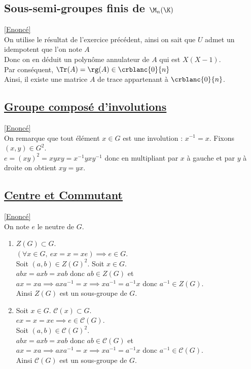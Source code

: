 \documentclass[8pt]{book}
\begin{document}
	\subsection{Sous-semi-groupes finis de $\M_n(\K)$ }
	\label{Sous-semi-groupes finis de Mn(K) corrigé}
	\textcolor{blue}{\hyperref[Sous-semi-groupes finis de Mn(K)]{[Enoncé]}}\\
	On utilise le résultat de l'exercice précédent, ainsi on sait que $U$ admet un idempotent que l'on note $A$
	\\ Donc on en déduit un polynôme annulateur de $A$ qui est $X(X-1)$. 
	\\Par conséquent, $\Tr(A)=\rg(A)\in\crblanc{0}{n}$
	\\Ainsi, il existe une matrice $A$ de trace appartenant à $\crblanc{0}{n}$. 
	
	\subsection{\underline{Groupe composé d'involutions} }
	\label{Groupe composé d'involutions corrigé}
	\textcolor{blue}{\hyperref[Groupe composé d'involutions]{[Enoncé]}}\\
	On remarque que tout élément $x\in G$ est une involution : $x^{-1}=x$. Fixons $(x,y)\in G^2$.\\
	$e=(xy)^2=xyxy=x^{-1}yxy^{-1}$ donc en multipliant par $x$ à gauche et par $y$ à droite on obtient $xy=yx$.
	
	\subsection{\underline{Centre et Commutant} }
	\label{Centre et Commutant corrigé}
	\textcolor{blue}{\hyperref[Centre et Commutant]{[Enoncé]}}\\
	On note $e$ le neutre de $G$.
	\begin{enumerate}[leftmargin=*]
		\item $Z(G)\subset G$.\\
		$(\forall x\in G,\ ex=x=xe)\implies e\in G$.\\
		Soit $(a,b)\in Z(G)^2$. Soit $x\in G$.\\
		$abx=axb=xab$ donc $ab\in Z(G)$ et $ax=xa\implies axa^{-1}=x\implies xa^{-1}=a^{-1}x$ donc $a^{-1}\in Z(G)$.\\
		Ainsi $Z(G)$ est un sous-groupe de $G$.
		\item Soit $x\in G$. $\mathcal{C}(x)\subset G$.\\
		$ex=x=xe\implies e\in \mathcal{C}(G)$.\\
		Soit $(a,b)\in \mathcal{C}(G)^2$.\\
		$abx=axb=xab$ donc $ab\in \mathcal{C}(G)$ et $ax=xa\implies axa^{-1}=x\implies xa^{-1}=a^{-1}x$ donc $a^{-1}\in \mathcal{C}(G)$.\\
		Ainsi $\mathcal{C}(G)$ est un sous-groupe de $G$.
	\end{enumerate}
	
\end{document}
